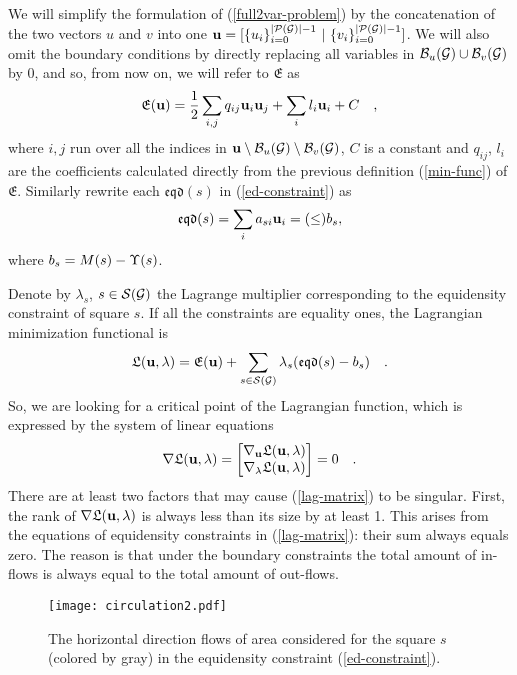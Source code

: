 \documentclass[final]{siamltex}
\begin{document}
We will simplify the formulation of (\ref{full2var-problem}) by
the concatenation of the two vectors $u$ and $v$ into one
${\bf u}=[\{u_i\}_{i=0}^{|\mathcal{P}(\mathcal{G})|-1}~|~\{v_i\}_{i=0}^{|\mathcal{P}(\mathcal{G})|-1}]$. We
will also omit the boundary conditions by directly replacing all
variables in $\mathcal{B}_u(\mathcal{G}) \cup \mathcal{B}_v(\mathcal{G})$ by $0$, and so, from
now on, we will refer to $\mathfrak{E}$ as
\begin{equation}\label{E-with-q-and-l}
\mathfrak{E}({\bf u}) = \frac{1}{2}\sum_{i,j}q_{ij}{\bf u}_i {\bf u}_j +
\sum_{i }l_i{\bf u}_i + C~~~,
\end{equation}
where $i,j$ run over all the indices in ${\bf u} \setminus \mathcal{B}_u(\mathcal{G})
\setminus \mathcal{B}_v(\mathcal{G})$, $C$ is a constant and $q_{ij}$,
$l_i$ are the coefficients calculated directly from the previous
definition (\ref{min-func}) of $\mathfrak{E}$. Similarly rewrite
each $\mathfrak{eqd}(s)$ in (\ref{ed-constraint}) as
\begin{equation}\label{eqd-with-a-and-b}
\mathfrak{eqd}(s) = \sum_{i}a_{si}{\bf u}_i=(\leq) b_s,
\end{equation}
where $b_s=M(s) - \Upsilon(s)$.
\par Denote by $\lambda_s$, $s\in \mathcal{S}(\mathcal{G})$ the Lagrange multiplier corresponding to the equidensity constraint
of square $s$.
If all the constraints are equality ones, the
Lagrangian minimization functional is
\begin{equation}\label{lagmin}
\mathfrak{L}({\bf u},\lambda)=\mathfrak{E}({\bf u}) + \sum_{s\in  \mathcal{S}(\mathcal{G})}
\lambda_s(\mathfrak{eqd}(s)-b_s)~~~.
\end{equation}
So, we are looking for a critical point of the Lagrangian function, which is expressed by the system of linear
equations
\begin{equation}\label{lag-matrix}
\nabla \mathfrak{L}({\bf u},\lambda)=
\begin{bmatrix}
\nabla_{{\bf u}}\mathfrak{L}({\bf u},\lambda) \\
\nabla_{\lambda}\mathfrak{L}({\bf u},\lambda)
\end{bmatrix}
=0 ~~~ .
\end{equation}
There are at least two factors that may cause (\ref{lag-matrix})
to be singular. First, the rank of $\nabla \mathfrak{L}({\bf u}, \lambda)$ is
always less than its size by at least 1. This arises from the
equations of equidensity constraints in (\ref{lag-matrix}): their
sum always equals zero. The reason is that under the
boundary constraints the total amount of in-flows is always equal
to the total amount of out-flows.
\begin{figure}[h]
\vbox{\center\texttt{[image: circulation2.pdf]}}
\caption{The horizontal direction flows of area considered for the
square $s$ (colored by gray) in the equidensity constraint
(\ref{ed-constraint}).}\label{circul-fig}
\end{figure}
\end{document}
